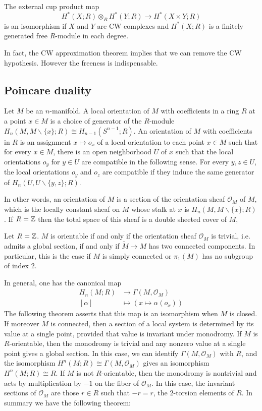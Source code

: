 \documentclass[12pt]{article}
\begin{document}
\begin{theorem}
    The external cup product map \[H^*(X;R) \otimes_R H^*(Y;R) \to H^*(X\times Y;R)\] is an isomorphism if $X$ and $Y$ are CW complexes and $H^*(X;R)$ is a finitely generated free $R$-module in each degree.
\end{theorem}
In fact, the CW approximation theorem implies that we can remove the CW hypothesis. However the freeness is indispensable.

\subsection{Poincare duality}
Let $M$ be an $n$-manifold. A local orientation of $M$ with coefficients in a ring $R$ at a point $x\in M$ is a choice of generator of the $R$-module $H_n(M,M\backslash \{x\};R) \cong H_{n-1}(S^{n-1};R)$. An orientation of $M$ with coefficients in $R$ is an assignment $x\mapsto o_x$ of a local orientation to each point $x\in M$ such that for every $x\in M$, there is an open neighborhood $U$ of $x$ such that the local orientations $o_y$ for $y\in U$ are compatible in the following sense. For every $y,z\in U$, the local orientations $o_y$ and $o_z$ are compatible if they induce the same generator of $H_n(U,U\backslash \{y,z\};R)$. 

In other words, an orientation of $M$ is a section of the orientation sheaf $\mathcal O_M$ of $M$, which is the locally constant sheaf on $M$ whose stalk at $x$ is $H_n(M,M\backslash \{x\};R)$. If $R = \mathbb{Z}$ then the total space of this sheaf is a double sheeted cover of $M$, 
\begin{proposition}
    Let $R = \mathbb{Z}$. $M$ is orientable if and only if the orientation sheaf $\mathcal O_M$ is trivial, i.e. admits a global section, if and only if $\tilde M \to M$ has two connected components. In particular, this is the case if $M$ is simply connected or $\pi_1(M)$ has no subgroup of index 2.
\end{proposition}

In general, one has the canonical map \begin{align*}
H_n(M;R) & \to \Gamma(M,\mathcal O_M) \\
[\alpha] & \mapsto (x\mapsto \alpha(o_x))
\end{align*}
The following theorem asserts that this map is an isomorphism when $M$ is closed. If moreover $M$ is connected, then a section of a local system is determined by its value at a single point, provided that value is invariant under monodromy. If $M$ is $R$-orientable, then the monodromy is trivial and any nonzero value at a single point gives a global section. In this case, we can identify $\Gamma(M,\mathcal O_M)$ with $R$, and the isomorphism $H^n(M;R)\cong \Gamma(M,\mathcal O_M)$ gives an isomorphism $H^n(M;R)\cong R$. If $M$ is not $R$-orientable, then the monodromy is nontrivial and acts by multiplication by $-1$ on the fiber of $\mathcal O_M$. In this case, the invariant sections of $\mathcal O_M$ are those $r\in R$ such that $-r=r$, the $2$-torsion elements of $R$. In summary we have the following theorem: 
\end{document}
